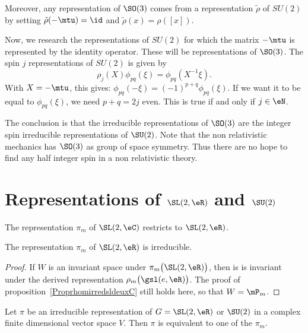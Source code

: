 Moreover, any representation of $\SO(3)$ comes from a representation $\tilde\rho$ of $SU(2)$ by setting $\tilde\rho(-\mtu)=\id$ and $\tilde\rho(x)=\rho([x])$.

Now, we research the representations of $SU(2)$ for which the matrix $-\mtu$ is represented by the identity operator. These will be representations of $\SO(3)$. The spin $j$ representations of $SU(2)$ is given by
\[
   \rho_j(X)\phi_{pq}(\xi)=\phi_{pq}(X^{-1}\xi).
\]
With $X=-\mtu$, this gives: $\phi_{pq}(-\xi)=(-1)^{p+q}\phi_{pq}(\xi)$. If we want it to be equal to $\phi_{pq}(\xi)$, we need $p+q=2j$ even. This is true if and only if $j\in\eN$.

\label{pg:reprez_SO3}The conclusion is that the irreducible representations of $\SO(3)$ are the integer spin irreducible representations of $\SU(2)$. Note that the non relativistic mechanics has $\SO(3)$ as group of space symmetry. Thus there are no hope to find any half integer spin in a non relativistic theory.

					\section{Representations of \texorpdfstring{$\SL(2,\eR)$}{SL2R} and \texorpdfstring{$\SU(2)$}{SU2}}

The representation $\pi_m$ of $\SL(2,\eC)$ restricts to $\SL(2,\eR)$.

\begin{lemma}
The representation $\pi_m$ of $\SL(2,\eR)$ is irreducible.
\end{lemma}

\begin{proof}
If $W$ is an invariant space under $\pi_m\big( \SL(2,\eR) \big)$, then is is invariant under the derived representation $\rho_m\big( \gsl(e,\eR) \big)$. The proof of proposition~\ref{ProprhomirredsldeuxC} still holds here, so that $W=\mP_m$.
\end{proof}

\begin{theorem}
Let $\pi$ be an irreducible representation of $G=\SL(2,\eR)$ or $\SU(2)$ in a complex finite dimensional vector space $V$. Then $\pi$ is equivalent to one of the $\pi_m$.
\end{theorem}

